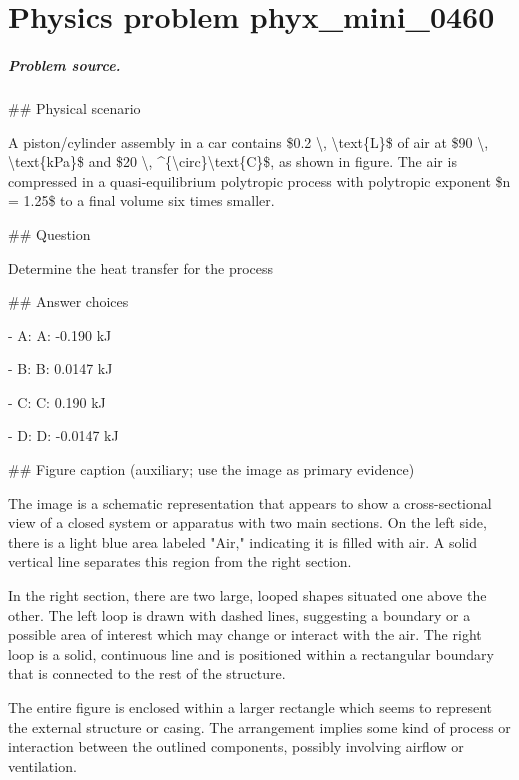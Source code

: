 
\chapter{Physics problem phyx\_mini\_0460}
\label{ch:PhyXMiniProblems_problem_phyx_mini_0460}

\paragraph{Problem source.}
\#\# Physical scenario

A piston/cylinder assembly in a car contains \$0.2 \textbackslash{}, \textbackslash{}text\{L\}\$ of air at \$90 \textbackslash{}, \textbackslash{}text\{kPa\}\$ and \$20 \textbackslash{}, \textasciicircum{}\{\textbackslash{}circ\}\textbackslash{}text\{C\}\$, as shown in figure. The air is compressed in a quasi-equilibrium polytropic process with polytropic exponent \$n = 1.25\$ to a final volume six times smaller.

\#\# Question

Determine the heat transfer for the process

\#\# Answer choices

- A: A: -0.190 kJ

- B: B: 0.0147 kJ

- C: C: 0.190 kJ

- D: D: -0.0147 kJ

\#\# Figure caption (auxiliary; use the image as primary evidence)

The image is a schematic representation that appears to show a cross-sectional view of a closed system or apparatus with two main sections. On the left side, there is a light blue area labeled "Air," indicating it is filled with air. A solid vertical line separates this region from the right section.

In the right section, there are two large, looped shapes situated one above the other. The left loop is drawn with dashed lines, suggesting a boundary or a possible area of interest which may change or interact with the air. The right loop is a solid, continuous line and is positioned within a rectangular boundary that is connected to the rest of the structure.

The entire figure is enclosed within a larger rectangle which seems to represent the external structure or casing. The arrangement implies some kind of process or interaction between the outlined components, possibly involving airflow or ventilation.

